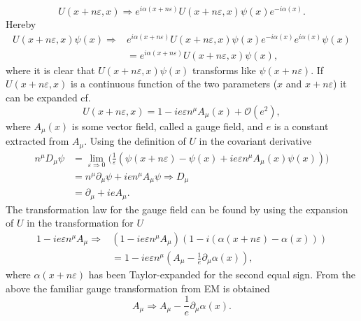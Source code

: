 \begin{equation}
	U(x+n\varepsilon,x)\Rightarrow e^{i\alpha(x+n\varepsilon)}U(x+n\varepsilon,x)\psi(x)e^{-i\alpha(x)}.
\end{equation} 
Hereby
\begin{equation}
	\begin{split}
		U(x+n\varepsilon,x)\psi(x)\Rightarrow &e^{i\alpha(x+n\varepsilon)}U(x+n\varepsilon,x)\psi(x)e^{-i\alpha(x)}e^{i\alpha(x)}\psi(x)\\
		&=e^{i\alpha(x+n\varepsilon)}U(x+n\varepsilon,x)\psi(x),
	\end{split}
\end{equation} 
where it is clear that $U(x+n\varepsilon,x)\psi(x)$ transforms like $\psi(x+n\varepsilon)$. If $U(x+n\varepsilon,x)$ is a continuous function of the two parameters ($x$ and $x+n\varepsilon$) it can be expanded cf.
\begin{equation}
	U(x+n\varepsilon,x)=1-ie\varepsilon n^\mu A_\mu(x)+\mathcal{O}(e^2),
\end{equation}   
where $A_\mu(x)$ is some vector field, called a gauge field, and $e$ is a constant extracted from $A_\mu$. Using the definition of $U$ in the covariant derivative
\begin{equation}
	\begin{split}
		n^\mu D_\mu \psi&=\lim\limits_{\varepsilon\Rightarrow 0}\bigg(\frac{1}{\varepsilon}(\psi(x+n\varepsilon)-\psi(x)+ie\varepsilon n^\mu A_\mu(x)\psi(x))\bigg)\\
		&=n^\mu \partial_\mu\psi+ien^\mu A_\mu\psi\Rightarrow D_\mu\\
		&=\partial_\mu+ieA_\mu.
	\end{split}
\end{equation}  
The transformation law for the gauge field can be found by using the expansion of $U$ in the transformation for $U$
\begin{equation}
	\begin{split}
		1-ie\varepsilon n^\mu A_\mu\Rightarrow &(1-ie\varepsilon n^\mu A_\mu)(1-i(\alpha(x+n\varepsilon)-\alpha(x)))\\
		&=1-ie\varepsilon n^\mu (A_\mu-\frac{1}{e}\partial_\mu\alpha(x)),
	\end{split}
\end{equation}  
where $\alpha(x+n\varepsilon)$ has been Taylor-expanded for the second equal sign. From the above the familiar gauge transformation from EM is obtained
\begin{equation}
	A_\mu\Rightarrow A_\mu-\frac{1}{e}\partial_\mu\alpha(x).
\end{equation} 
